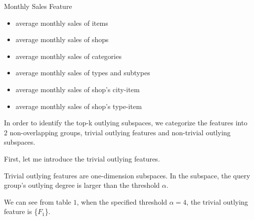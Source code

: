 \documentclass[
 size=12pt,
 paper=smartboard,  %
 mode=present, 		%
 display=slides, 	%
 style=tuliplab,  	%
 pauseslide,
 fleqn,leqno]{powerdot}
\begin{document}
\begin{slide}{Monthly Sales Feature}
  \begin{itemize}
    \item
    \smallskip
    average monthly sales of items
    \item
    average monthly sales of shops
    \item
    \smallskip
    average monthly sales of categories
    \item
    average monthly sales of types and subtypes
    \item
    \smallskip
    average monthly sales of shop’s city-item
    \item
    average monthly sales of shop’s type-item
  \end{itemize}
    
    \begin{note}
    In order to identify the top-k outlying subspaces,
    we categorize the features into $2$ non-overlapping groups,
    trivial outlying features and non-trivial outlying subspaces.
    
    First, let me introduce the trivial outlying features.
    
    Trivial outlying features are one-dimension subspaces.
    In the subspace,
    the query group's outlying degree is larger than the threshold $\alpha$.
    
    We can see from table $1$,
    when the specified threshold $\alpha = 4$,
    the trivial outlying feature is \{$F_1$\}.
    \end{note}
    
    \end{slide}
\end{document}
